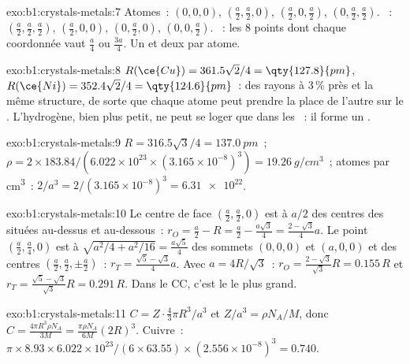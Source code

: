 \begin{solution}{exo:b1:crystals-metals:7}
Atomes~: $(0,0,0)$, $(\frac a2,\frac a2,0)$, $(\frac a2,0,\frac a2)$,
$(0,\frac a2,\frac a2)$. ~: $(\frac a2,\frac a2,\frac a2)$,
$(\frac a2,0,0)$, $(0,\frac a2,0)$, $(0,0,\frac a2)$. ~:
les 8 points dont chaque coordonnée vaut $\frac a4$ ou $\frac{3a}{4}$. Un
 et deux  par atome.
\end{solution}

\begin{solution}{exo:b1:crystals-metals:8}
$R(\ce{Cu}) = 361.5\sqrt2/4 = \qty{127.8}{pm}$, $R(\ce{Ni}) = 352.4\sqrt2/4
= \qty{124.6}{pm}$~: des rayons à 3\,\% près et la même structure, de
sorte que chaque atome peut prendre la place de l'autre sur le .
L'hydrogène, bien plus petit, ne peut se loger que dans les ~: il forme un .
\end{solution}

\begin{solution}{exo:b1:crystals-metals:9}
$R = 316.5\sqrt3/4 = \qty{137.0}{pm}$~; $\rho = 2 \times 183.84/(6.022 \times
10^{23} \times (3.165 \times 10^{-8})^3) = \qty{19.26}{g/cm^3}$~; atomes
par \unit{cm^3}~: $2/a^3 = 2/(3.165 \times 10^{-8})^3 = \num{6.31e22}$.
\end{solution}

\begin{solution}{exo:b1:crystals-metals:10}
Le centre de face $(\frac a2,\frac a2,0)$ est à $a/2$ des centres des
 situées au-dessus et au-dessous~: $r_O = \frac a2 - R = \frac a2 - \frac{a\sqrt3}{4}
= \frac{2-\sqrt3}{4}a$. Le point $(\frac a2,\frac a4,0)$ est à
$\sqrt{a^2/4 + a^2/16} = \frac{a\sqrt5}{4}$ des sommets $(0,0,0)$ et
$(a,0,0)$ et des centres $(\frac a2,\frac a2,\pm\frac a2)$~:
$r_T = \frac{\sqrt5 - \sqrt3}{4}a$. Avec $a = 4R/\sqrt3$~:
$r_O = \frac{2-\sqrt3}{\sqrt3}R = 0.155\,R$ et
$r_T = \frac{\sqrt5-\sqrt3}{\sqrt3}R = 0.291\,R$. Dans le CC, c'est le
 le plus grand.
\end{solution}

\begin{solution}{exo:b1:crystals-metals:11}
$C = Z\cdot\frac43\pi R^3/a^3$ et $Z/a^3 = \rho N_A/M$, donc $C =
\frac{4\pi R^3\rho N_A}{3M} = \frac{\pi\rho N_A}{6M}(2R)^3$. Cuivre~:
$\pi \times 8.93 \times 6.022 \times 10^{23}/(6 \times 63.55) \times (2.556
\times 10^{-8})^3 = 0.740$.
\end{solution}

